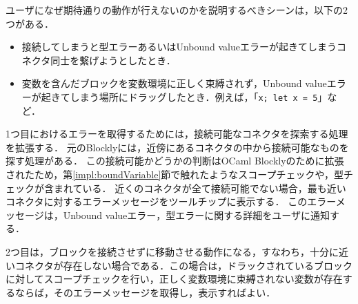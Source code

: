 ユーザになぜ期待通りの動作が行えないのかを説明するべきシーンは，以下の2つがある．
\begin {itemize}
  \item 接続してしまうと型エラーあるいはUnbound valueエラーが起きてしまうコネクタ同士を繋げようとしたとき．
  \item 変数を含んだブロックを変数環境に正しく束縛されず，Unbound valueエラーが起きてしまう場所にドラッグしたとき．例えば，「{\tt x; let x = 5}」など．
\end {itemize}

1つ目におけるエラーを取得するためには，接続可能なコネクタを探索する処理を拡張する．
元のBlocklyには，近傍にあるコネクタの中から接続可能なものを探す処理がある．
この接続可能かどうかの判断はOCaml Blocklyのために拡張されたため，第\ref{impl:boundVariable}節で触れたようなスコープチェックや，型チェックが含まれている．
近くのコネクタが全て接続可能でない場合，最も近いコネクタに対するエラーメッセージをツールチップに表示する．
このエラーメッセージは，Unbound valueエラー，型エラーに関する詳細をユーザに通知する．

2つ目は，ブロックを接続させずに移動させる動作になる，すなわち，十分に近いコネクタが存在しない場合である．この場合は，ドラックされているブロックに対してスコープチェックを行い，正しく変数環境に束縛されない変数が存在するならば，そのエラーメッセージを取得し，表示すればよい．


